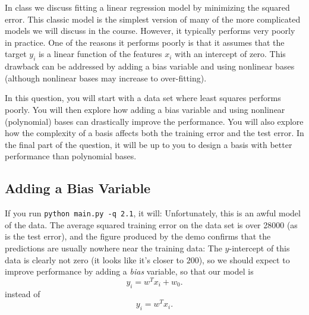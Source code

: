 \documentclass{article}
\begin{document}
In class we discuss fitting a linear regression model by minimizing the squared error. 
This classic model is the simplest version of many of the more complicated models we will discuss in the course. 
However, it typically performs very poorly in practice. 
One of the reasons it performs poorly is that it assumes that the target $y_i$ is a linear function of 
the features $x_i$ with an intercept of zero. This drawback can be addressed by adding a bias variable
 and using nonlinear bases (although nonlinear bases may increase to over-fitting). 

In this question, you will start with a data set where least squares performs poorly. 
You will then explore how adding a bias variable and using nonlinear (polynomial) bases can drastically improve the performance. 
You will also explore how the complexity of a basis affects both the training error and the test error. 
In the final part of the question, it will be up to you to design a basis with better performance than polynomial bases. 

\subsection{Adding a Bias Variable}

If you run  \verb|python main.py -q 2.1|, it will:
Unfortunately, this is an awful model of the data. The average squared training error on the data set is over 28000 
(as is the test error), and the figure produced by the demo confirms that the predictions are usually nowhere near
 the training data:
The $y$-intercept of this data is clearly not zero (it looks like it's closer to $200$), 
so we should expect to improve performance by adding a \emph{bias} variable, so that our model is
\[
y_i = w^Tx_i + w_0.
\]
instead of
\[
y_i = w^Tx_i.
\]
\end{document}
